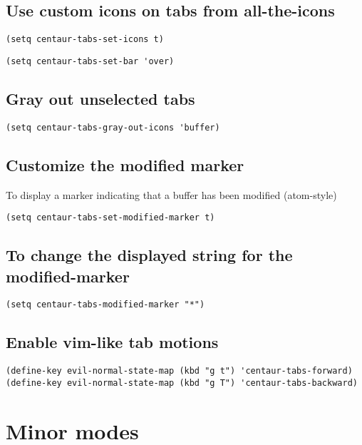 \documentclass[11pt]{article}
\begin{document}
\subsection*{Use custom icons on tabs from all-the-icons}
\label{sec:orgec76008}
\begin{verbatim}
(setq centaur-tabs-set-icons t)
\end{verbatim}


\begin{verbatim}
(setq centaur-tabs-set-bar 'over)
\end{verbatim}

\subsection*{Gray out unselected tabs}
\label{sec:org55eff4a}
\begin{verbatim}
(setq centaur-tabs-gray-out-icons 'buffer)
\end{verbatim}

\subsection*{Customize the modified marker}
\label{sec:org8b77790}
To display a marker indicating that a buffer has been modified (atom-style)
\begin{verbatim}
(setq centaur-tabs-set-modified-marker t)
\end{verbatim}

\subsection*{To change the displayed string for the modified-marker}
\label{sec:org9e4fb30}
\begin{verbatim}
(setq centaur-tabs-modified-marker "*")
\end{verbatim}


\subsection*{Enable vim-like tab motions}
\label{sec:orgfd8d957}
\begin{verbatim}
(define-key evil-normal-state-map (kbd "g t") 'centaur-tabs-forward)
(define-key evil-normal-state-map (kbd "g T") 'centaur-tabs-backward)
\end{verbatim}



\section*{Minor modes}
\label{sec:org9de4594}
\end{document}
